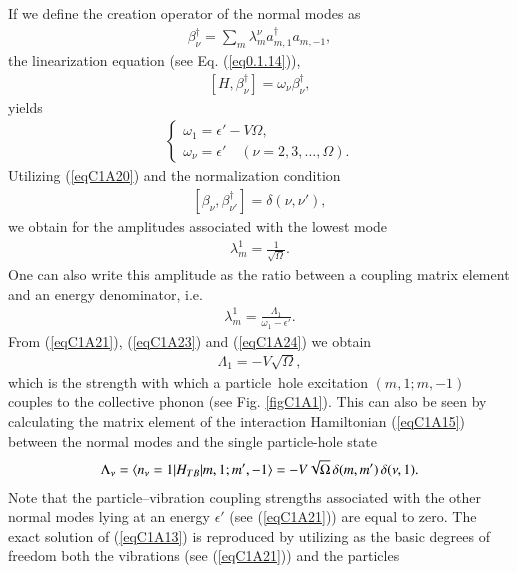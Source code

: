 If we define the creation operator of the normal modes as
 \begin{align}\label{eqC1A19} 
\beta^\dagger_\nu=\sum_m \lambda_m^\nu a_{m,1}^\dagger a_{m,-1},
 \end{align}
the linearization equation (see Eq. (\ref{eq0.1.14})),
 \begin{align}\label{eqC1A20} 
[H,\beta_\nu^\dagger]=\omega_\nu\beta^\dagger_\nu,
 \end{align}
yields
 \begin{align}\label{eqC1A21} 
\left\{\begin{array}{l}
 \omega_1=\epsilon'-V\Omega,\\ 
\omega_\nu=\epsilon'\quad (\nu=2,3,\dots,\Omega).
\end{array} \right.
 \end{align}
Utilizing (\ref{eqC1A20}) and the normalization condition
 \begin{align}\label{eqC1A22} 
[\beta_\nu,\beta^\dagger_{\nu'}]=\delta(\nu,\nu'),
 \end{align}
we obtain for the amplitudes associated with the lowest mode
 \begin{align}\label{eqC1A23} 
\lambda_m^1=\frac{1}{\sqrt{\Omega}}.
 \end{align}
One can also write this amplitude as the ratio between a coupling matrix
element and an energy denominator, i.e.
 \begin{align}\label{eqC1A24} 
\lambda_m^1=\frac{\Lambda_1}{\omega_1-\epsilon'}.
 \end{align} 
From (\ref{eqC1A21}), (\ref{eqC1A23}) and (\ref{eqC1A24}) we obtain
 \begin{align}\label{eqC1A25} 
\Lambda_1=-V\sqrt{\Omega},
 \end{align}
which is the strength with which a particle~hole excitation $(m, 1; m, -1)$
couples to the collective phonon (see Fig. \ref{figC1A1}). This can also be seen by calculating
the matrix element of the interaction Hamiltonian (\ref{eqC1A15}) between the normal
modes and the single particle-hole state
 \begin{align}\label{eqC1A26} 
\Lambda_\nu=\langle {n_\nu=1|H_{TB}|m,1;m',-1} \rangle=-V\sqrt{\Omega}\,\delta(m,m')\,\delta(\nu,1).
 \end{align}
Note that the particle--vibration coupling strengths associated with the other
normal modes lying at an energy $\epsilon'$ (see (\ref{eqC1A21})) are equal to zero. The exact solution of (\ref{eqC1A13}) is reproduced by utilizing
as the basic degrees of freedom both the vibrations (see (\ref{eqC1A21})) and the particles
